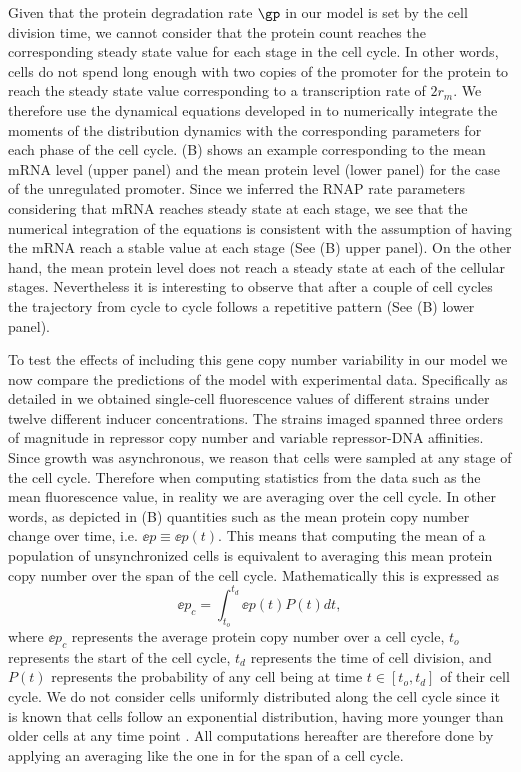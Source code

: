 Given that the protein degradation rate $\gp$ in our model is set by the cell
division time, we cannot consider that the protein count reaches the
corresponding steady state value for each stage in the cell cycle. In other
words, cells do not spend long enough with two copies of the promoter for the
protein to reach the steady state value corresponding to a transcription rate of
$2 r_m$. We therefore use the dynamical equations developed in
 to numerically integrate the moments of the distribution
dynamics with the corresponding parameters for each phase of the cell cycle.
(B) shows an example corresponding to the mean mRNA level
(upper panel) and the mean protein level (lower panel) for the case of the
unregulated promoter. Since we inferred the RNAP rate parameters considering
that mRNA reaches steady state at each stage, we see that the numerical
integration of the equations is consistent with the assumption of having the
mRNA reach a stable value at each stage (See (B) upper
panel). On the other hand, the mean protein level does not reach a steady state
at each of the cellular stages. Nevertheless it is interesting to observe that
after a couple of cell cycles the trajectory from cycle to cycle follows a
repetitive pattern (See (B) lower panel).

To test the effects of including this gene copy number variability in our model
we now compare the predictions of the model with experimental data. Specifically
as detailed in  we obtained single-cell fluorescence values of
different strains under twelve different inducer concentrations. The strains
imaged spanned three orders of magnitude in repressor copy number and variable
repressor-DNA affinities. Since growth was asynchronous, we reason that cells
were sampled at any stage of the cell cycle. Therefore when computing statistics
from the data such as the mean fluorescence value, in reality we are averaging
over the cell cycle. In other words, as depicted in (B)
quantities such as the mean protein copy number change over time, i.e. $\ee{p}
\equiv \ee{p(t)}$. This means that computing the mean of a population of
unsynchronized cells is equivalent to averaging this mean protein copy number
over the span of the cell cycle. Mathematically this is expressed as
\begin{equation}
	\ee{p}_c = \int_{t_o}^{t_d} \ee{p(t)} P(t) dt,
	\label{eq_time_avg}
\end{equation}
where $\ee{p}_c$ represents the average protein copy number over a cell cycle,
$t_o$ represents the start of the cell cycle, $t_d$ represents the time of cell
division, and $P(t)$ represents the probability of any cell being at time $t \in
[t_o, t_d]$ of their cell cycle. We do not consider cells uniformly distributed
along the cell cycle since it is known that cells follow an exponential
distribution, having more younger than older cells at any time point
\cite{Powell1956}. All computations hereafter are therefore done by applying an
averaging like the one in  for the span of a cell cycle.


